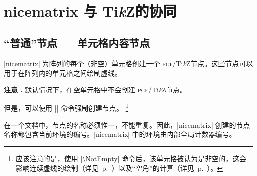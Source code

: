 \documentclass[dvipsnames]{article}%
\def\tikzname{Ti\emph{k}Z}
\begin{document}
\section{nicematrix 与 \tikzname 的协同}

\label{name}\label{PGF-nodes}

\subsection{“普通”节点 --- 单元格内容节点}
\label{zm:NormalNodes}


|nicematrix| 为阵列的每个（非空）单元格创建一个 \textsc{pgf}/\tikzname 节点。这些节点可以用于在阵列内的单元格之间绘制虚线。


\smallskip
\textbf{注意}：默认情况下，在空单元格中不会创建 \textsc{pgf}/\tikzname 节点。

\smallskip
但是，可以使用 |\NotEmpty| 命令强制创建节点。
\footnote{应该注意的是，使用 |\textbackslash NotEmpty| 命令后，该单元格被认为是非空的，这会影响连续虚线的绘制（详见~p.~\pageref{Cdots}）以及“空角”的计算（详见~p.~\pageref{corners}）。}

\medskip
在一个文档中，节点的名称必须惟一，不能重复。因此，|nicematrix| 创建的节点名称都包含当前环境的编号。|nicematrix| 中的环境由内部全局计数器编号。 
\end{document}
